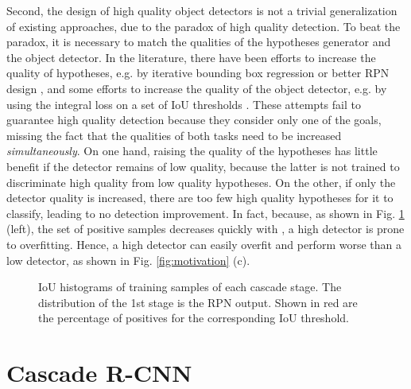\documentclass[10pt,journal,compsoc]{IEEEtran}
\begin{document}
Second, the design of high quality object detectors is
not a trivial generalization of existing approaches, due to the
paradox of high quality detection.
To beat the paradox, it is necessary to match the qualities of the
hypotheses generator and the object detector. In the literature,
there have been efforts to increase the quality of hypotheses, e.g. by
iterative bounding box regression \cite{DBLP:conf/cvpr/GidarisK16,DBLP:conf/bmvc/GidarisK16} or better RPN design
\cite{DBLP:conf/eccv/CaiFFV16,lin2017feature}, and some efforts to increase
the quality of the object detector, e.g. by using the integral loss on a set
of IoU thresholds \cite{DBLP:conf/bmvc/ZagoruykoLLPGCD16}. These attempts
fail to guarantee high quality detection because they consider
only one of the goals, missing the fact that the qualities of both
tasks need to be increased \textit{simultaneously}.
On one hand, raising the quality of the hypotheses has little benefit
if the detector remains of low quality, because the latter is not trained
to discriminate high quality from low quality  hypotheses.
On the other, if only the detector
quality is increased, there are too few high quality hypotheses for it
to classify, leading to no detection improvement. In fact,
because, as shown in Fig. \ref{fig:hist} (left),
the set of positive samples decreases quickly with ,
a high  detector is prone to overfitting. Hence, a high  detector can
easily overfit and perform worse than a low 
detector, as shown in Fig. \ref{fig:motivation} (c).


\begin{figure}[!t]
\begin{minipage}[b]{.3\linewidth}
\centering
\centerline{}
\end{minipage}
\hfill
\begin{minipage}[b]{.3\linewidth}
\centering
\centerline{}
\end{minipage}
\hfill
\begin{minipage}[b]{.3\linewidth}
\centering
\centerline{}
\end{minipage}
\caption{IoU histograms of training samples of each cascade stage. The
distribution of the 1st stage is the RPN output. Shown in red are the
percentage of positives for the corresponding IoU threshold.}
\label{fig:hist}
\end{figure}


\section{Cascade R-CNN}
\end{document}
